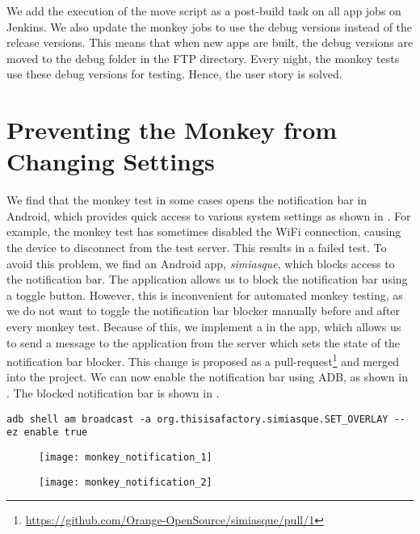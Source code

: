 We add the execution of the move script as a post-build task on all app jobs on Jenkins. We also update the monkey jobs to use the debug versions instead of the release versions. This means that when new apps are built, the debug versions are moved to the debug folder in the FTP directory. Every night, the monkey tests use these debug versions for testing. Hence, the user story is solved.

\section{Preventing the Monkey from Changing Settings}\label{sec:monkey_simiasque}
We find that the monkey test in some cases opens the notification bar in Android, which provides quick access to various system settings as shown in . For example, the monkey test has sometimes disabled the WiFi connection, causing the device to disconnect from the test server. This results in a failed test. To avoid this problem, we find an Android app, \emph{simiasque}\parencite{simiasque-app}, which blocks access to the notification bar. The application allows us to block the notification bar using a toggle button. However, this is inconvenient for automated monkey testing, as we do not want to toggle the notification bar blocker manually before and after every monkey test. Because of this, we implement a  in the app, which allows us to send a message to the application from the server which sets the state of the notification bar blocker. This change is proposed as a pull-request\footnote{\url{https://github.com/Orange-OpenSource/simiasque/pull/1}} and merged into the project. We can now enable the notification bar using ADB, as shown in . The blocked notification bar is shown in .
\begin{lstlisting}[float,label=lst:adb-simiasque-broadcast,caption=Command for enabling the notification bar blocker]
adb shell am broadcast -a org.thisisafactory.simiasque.SET_OVERLAY --ez enable true
\end{lstlisting}

\begin{figure}
\centering
\begin{minipage}{.45\textwidth}
  \centering
  \texttt{[image: monkey\_notification\_1]}
  \label{fig:android_notification_settings}
\end{minipage}
\begin{minipage}{.45\textwidth}
  \centering
  \texttt{[image: monkey\_notification\_2]}
  \label{fig:android_notification_blocker}
\end{minipage}
\end{figure}


